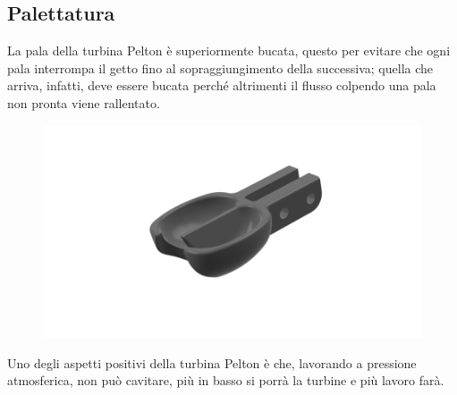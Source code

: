 \documentclass[a4paper, 15pt]{article}
\begin{document}
\subsection{Palettatura}
\begin{adjustwidth}{2in}{}
	
	La pala della turbina Pelton è superiormente bucata, questo per evitare che ogni pala interrompa il getto fino al sopraggiungimento della successiva; quella che arriva, infatti, deve essere bucata perché altrimenti il flusso colpendo una pala non pronta viene rallentato. 
	\begin{figure}[H]
		\centering
		\includegraphics[width=0.7\linewidth]{immagini/turbinapelton6}
		\label{fig:turbinapelton6}
	\end{figure}
	Uno degli aspetti positivi della turbina Pelton è che, lavorando a pressione atmosferica, non può cavitare, più in basso si porrà la turbine e più lavoro farà. 	
\end{adjustwidth}
\end{document}
